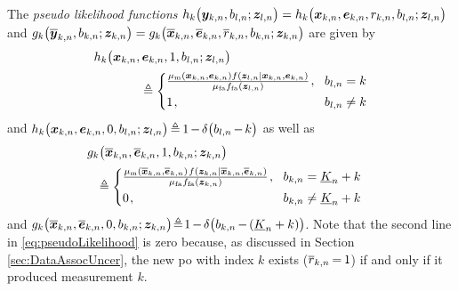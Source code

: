 \documentclass[10pt, twoside, romanappendices]{IEEEtran}
\providecommand{\ist}{\hspace*{.3mm}}
\providecommand{\rmv}{\hspace*{-.3mm}}
\providecommand{\nn}{\nonumber}
\begin{document}
The \textit{pseudo likelihood functions} $h_k\big( \bm{y}_{k,n}, b_{l,n}; \bm{z}_{l,n} \big) = h_k\big( \bm{x}_{k,n}, \bm{e}_{k,n}, r_{k,n}, b_{l,n}; \bm{z}_{l,n} \big)$ and $g_k\big( \overline{\bm{y}}_{k,n}, b_{k,n}; \bm{z}_{k,n} \big) = g_k\big( \overline{\bm{x}}_{k,n}, \overline{\bm{e}}_{k,n}, \overline{r}_{k,n}, b_{k,n}; \bm{z}_{k,n} \big)$ are given by
\begin{align}
&h_k\big( \V{x}_{k,n},  \V{e}_{k,n}, 1, b_{l,n}; \V{z}_{l,n} \big)  \nn \\[.5mm]
&\hspace{13mm} \triangleq \begin{cases}
      \frac{\mu_{\mathrm{m}}(\V{x}_{k,n},\V{e}_{k,n}) f(\V{z}_{l,n}| \V{x}_{k,n}, \V{e}_{k,n})}{\mu_{\mathrm{fa}}  f_{\mathrm{fa}}(\V{z}_{l,n})}    \ist, 
       & \rmv\rmv b_{l,n} = k \\[1mm]
     1 \ist,  & \rmv\rmv b_{l,n} \neq k 
  \end{cases} \label{eq:pseudoLikelihood1}
\end{align}
and $h_k\big( \V{x}_{k,n}, \V{e}_{k,n}, 0,  b_{l,n}; \V{z}_{l,n} \big)  \rmv\triangleq\rmv 1 \rmv - \rmv \delta \big( b_{l,n} \rmv - \rmv k \big)$ as well as
\begin{align}
&\hspace{-2.5mm}g_k\big( \overline{\V{x}}_{k,n}, \overline{\V{e}}_{k,n}, 1, b_{k,n}; \V{z}_{k,n} \big) \nn \\[.5mm]
&\hspace{0mm} \triangleq \begin{cases}
      \frac{ \mu_{\mathrm{m}}(\overline{\V{x}}_{k,n},\overline{\V{e}}_{k,n}) \ist f(\V{z}_{k,n}| \overline{\V{x}}_{k,n},\overline{\V{e}}_{k,n})}{\mu_{\mathrm{fa}}  f_{\mathrm{fa}}(\V{z}_{k,n})}    \ist, 
       & \rmv\rmv b_{k,n} = \underline{K}_n + k \\[1mm]
     0 \ist,  & \rmv\rmv b_{k,n} \neq \underline{K}_n + k \
 \end{cases} \label{eq:pseudoLikelihood}
\end{align}
and $g_k\big( \overline{\V{x}}_{k,n}, \overline{\V{e}}_{k,n}, 0, b_{k,n}; \V{z}_{k,n} \big) \rmv\rmv\triangleq\rmv\rmv 1 \rmv - \rmv \delta \big( b_{k,n} \rmv - \rmv ( \underline{K}_n + k ) \big)$. Note that the second line in \eqref{eq:pseudoLikelihood} is zero because, as discussed in Section \ref{sec:DataAssocUncer}, the new \ac{po} with index $k$ exists ($\overline{r}_{k,n} \rmv=\rmv 1$) if and only if it produced measurement $k$.  
\end{document}
